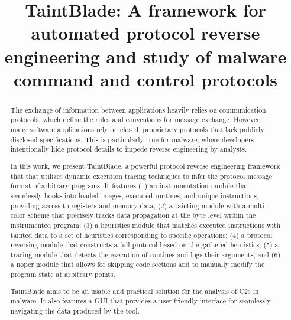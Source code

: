 \documentclass[conference]{IEEEtran}
\begin{document}
\title{TaintBlade: A framework for automated protocol reverse engineering and study of malware command and control protocols
}

\author{
    \and
}

\maketitle

\begin{abstract}
    The exchange of information between applications heavily relies on 
    communication protocols, which define the rules and conventions for message exchange.
    However, many software applications rely on closed, proprietary protocols that lack publicly
    disclosed specifications. This is particularly true for malware, where developers intentionally 
    hide protocol details to impede reverse engineering by analysts. 

    In this work, we present TaintBlade, a powerful protocol reverse engineering framework that 
    that utilizes dynamic execution tracing techniques to infer the protocol message format 
    of arbitrary programs. It features (1) an
    instrumentation module that seamlessly hooks into loaded images, executed routines, 
    and unique instructions, providing access to registers and memory data; 
    (2) a tainting module with a multi-color scheme that precisely tracks data propagation 
    at the byte level within the instrumented program; (3) a heuristics module that matches executed
    instructions with tainted data to a set of heuristics corresponding to specific
    operations; (4) a protocol reversing module that constructs a full protocol
    based on the gathered heuristics; (5) a tracing module that detects the execution 
    of routines and logs their arguments; and (6) a noper module
    that allows for skipping code sections and to manually modify the program state
    at arbitrary points.

    TaintBlade aims to be an usable and practical solution for the analysis of C2s in malware.
    It also features a GUI that provides a user-friendly interface for seamlessly navigating
    the data produced by the tool.
\end{abstract}
\end{document}
